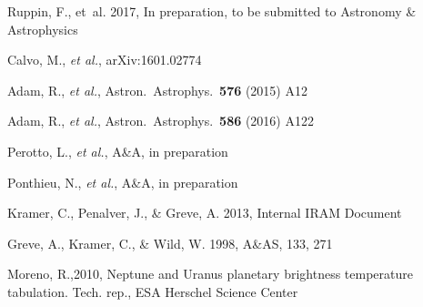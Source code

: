 \begin{thebibliography}{99}
Ruppin, F., {et~al.} 2017, 
In preparation, to be submitted to Astronomy \& Astrophysics

Calvo, M., {\it et al.}, arXiv:1601.02774  


Adam, R.,  {\it et al.},
  Astron.\ Astrophys.\  {\bf 576} (2015) A12
  
  
Adam, R.,  {\it et al.},
  Astron.\ Astrophys.\  {\bf 586} (2016) A122

    
Perotto, L., {\it et al.}, A\&A, in preparation

Ponthieu, N., {\it et al.}, A\&A, in preparation

Kramer, C., Penalver, J., \& Greve, A. 2013, Internal IRAM Document

Greve, A., Kramer, C., \& Wild, W. 1998, A\&AS, 133, 271
 
Moreno, R.,2010, Neptune and Uranus planetary brightness temperature tabulation. Tech. rep., ESA Herschel Science Center
 

\end{thebibliography}
